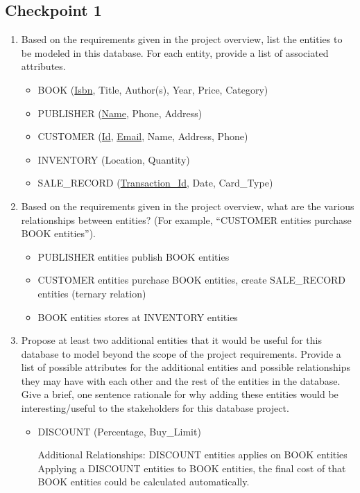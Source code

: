 \documentclass[12pt, letterpaper]{report}
\begin{document}
\subsection{Checkpoint 1}
\begin{enumerate}

\item Based on the requirements given in the project overview, list the entities to be modeled in this database.  For each entity, provide a list of associated attributes.
  \begin{itemize}
  \item BOOK (\underline{Isbn}, Title, Author(s), Year, Price, Category)
  \item PUBLISHER (\underline{Name}, Phone, Address)
  \item CUSTOMER (\underline{Id}, \underline{Email}, Name, Address, Phone)
  \item INVENTORY (Location, Quantity)
  \item SALE\_RECORD (\underline{Transaction\_Id}, Date, Card\_Type)
  \end{itemize}

\item Based on the requirements given in the project overview, what are the various relationships between entities?  (For example, “CUSTOMER entities purchase BOOK entities”).
  \begin{itemize}
    \item PUBLISHER entities publish BOOK entities
    \item CUSTOMER entities purchase BOOK entities, create SALE\_RECORD entities (ternary relation)
    \item BOOK entities stores at INVENTORY entities
  \end{itemize}

\item Propose at least two additional entities that it would be useful for this database to model beyond the scope of the project requirements.  Provide a list of possible attributes for the additional entities and possible relationships they may have with each other and the rest of the entities in the database. Give a brief, one sentence rationale for why adding these entities would be interesting/useful to the stakeholders for this database project.
  \begin{itemize}
  \item DISCOUNT (Percentage, Buy\_Limit)

    Additional Relationships: DISCOUNT entities applies on BOOK entities
    Applying a DISCOUNT entities to BOOK entities, the final cost of that BOOK entities could be calculated automatically.


\end{itemize}
\end{enumerate}
\end{document}
